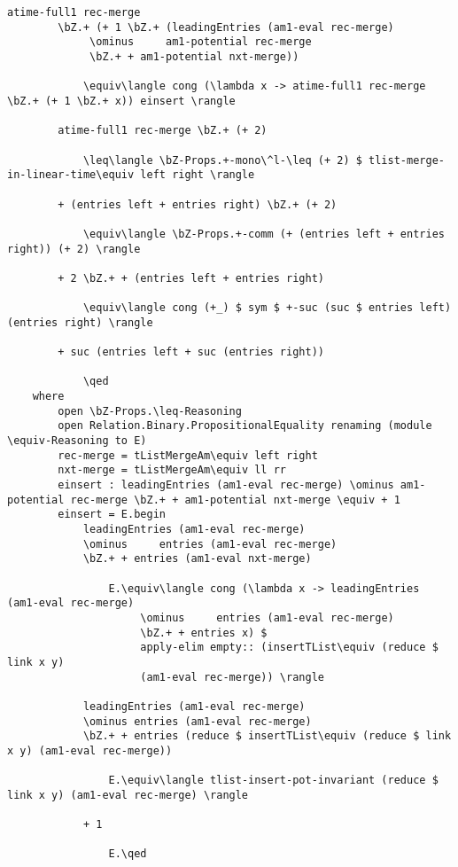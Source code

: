 \begin{lstlisting}[caption={Merging heaps},label={lst:appendix:heap:merge}]
        atime-full1 rec-merge
        \bZ.+ (+ 1 \bZ.+ (leadingEntries (am1-eval rec-merge)
             \ominus     am1-potential rec-merge
             \bZ.+ + am1-potential nxt-merge))

            \equiv\langle cong (\lambda x -> atime-full1 rec-merge \bZ.+ (+ 1 \bZ.+ x)) einsert \rangle

        atime-full1 rec-merge \bZ.+ (+ 2)

            \leq\langle \bZ-Props.+-mono\^l-\leq (+ 2) $ tlist-merge-in-linear-time\equiv left right \rangle

        + (entries left + entries right) \bZ.+ (+ 2)

            \equiv\langle \bZ-Props.+-comm (+ (entries left + entries right)) (+ 2) \rangle

        + 2 \bZ.+ + (entries left + entries right)

            \equiv\langle cong (+_) $ sym $ +-suc (suc $ entries left) (entries right) \rangle

        + suc (entries left + suc (entries right))

            \qed
    where
        open \bZ-Props.\leq-Reasoning
        open Relation.Binary.PropositionalEquality renaming (module \equiv-Reasoning to E)
        rec-merge = tListMergeAm\equiv left right
        nxt-merge = tListMergeAm\equiv ll rr
        einsert : leadingEntries (am1-eval rec-merge) \ominus am1-potential rec-merge \bZ.+ + am1-potential nxt-merge \equiv + 1
        einsert = E.begin
            leadingEntries (am1-eval rec-merge)
            \ominus     entries (am1-eval rec-merge)
            \bZ.+ + entries (am1-eval nxt-merge)

                E.\equiv\langle cong (\lambda x -> leadingEntries (am1-eval rec-merge)
                     \ominus     entries (am1-eval rec-merge)
                     \bZ.+ + entries x) $
                     apply-elim empty:: (insertTList\equiv (reduce $ link x y)
                     (am1-eval rec-merge)) \rangle

            leadingEntries (am1-eval rec-merge)
            \ominus entries (am1-eval rec-merge)
            \bZ.+ + entries (reduce $ insertTList\equiv (reduce $ link x y) (am1-eval rec-merge))

                E.\equiv\langle tlist-insert-pot-invariant (reduce $ link x y) (am1-eval rec-merge) \rangle

            + 1

                E.\qed


\end{lstlisting}
